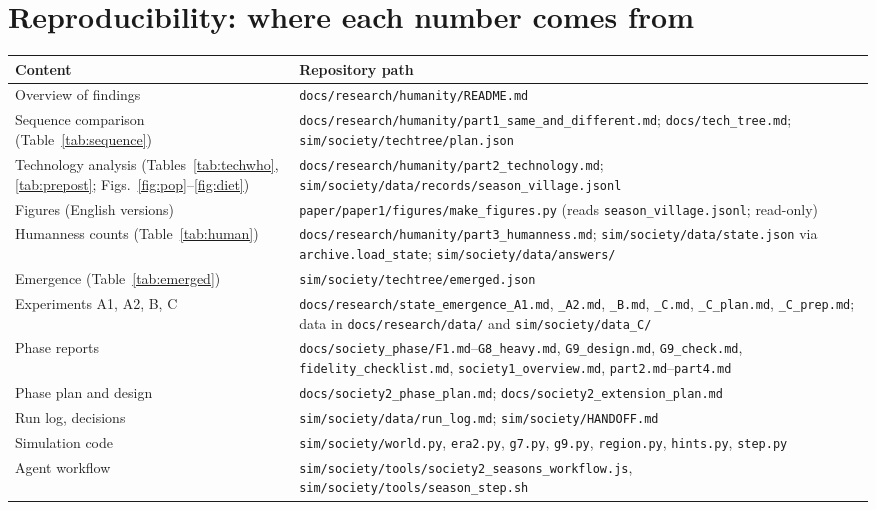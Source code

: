 \documentclass[11pt]{article}
\begin{document}
\section{Reproducibility: where each number comes from}
\begin{center}\small
\begin{tabularx}{\linewidth}{@{}l L@{}}
\toprule
Content & Repository path \\
\midrule
Overview of findings & \texttt{docs/research/humanity/README.md} \\
Sequence comparison (Table~\ref{tab:sequence}) & \texttt{docs/research/humanity/part1\_same\_and\_different.md}; \texttt{docs/tech\_tree.md}; \texttt{sim/society/techtree/plan.json} \\
Technology analysis (Tables~\ref{tab:techwho}, \ref{tab:prepost}; Figs.~\ref{fig:pop}--\ref{fig:diet}) & \texttt{docs/research/humanity/part2\_technology.md}; \texttt{sim/society/data/records/season\_village.jsonl} \\
Figures (English versions) & \texttt{paper/paper1/figures/make\_figures.py} (reads \texttt{season\_village.jsonl}; read-only) \\
Humanness counts (Table~\ref{tab:human}) & \texttt{docs/research/humanity/part3\_humanness.md}; \texttt{sim/society/data/state.json} via \texttt{archive.load\_state}; \texttt{sim/society/data/answers/} \\
Emergence (Table~\ref{tab:emerged}) & \texttt{sim/society/techtree/emerged.json} \\
Experiments A1, A2, B, C & \texttt{docs/research/state\_emergence\_A1.md}, \texttt{\_A2.md}, \texttt{\_B.md}, \texttt{\_C.md}, \texttt{\_C\_plan.md}, \texttt{\_C\_prep.md}; data in \texttt{docs/research/data/} and \texttt{sim/society/data\_C/} \\
Phase reports & \texttt{docs/society\_phase/F1.md}--\texttt{G8\_heavy.md}, \texttt{G9\_design.md}, \texttt{G9\_check.md}, \texttt{fidelity\_checklist.md}, \texttt{society1\_overview.md}, \texttt{part2.md}--\texttt{part4.md} \\
Phase plan and design & \texttt{docs/society2\_phase\_plan.md}; \texttt{docs/society2\_extension\_plan.md} \\
Run log, decisions & \texttt{sim/society/data/run\_log.md}; \texttt{sim/society/HANDOFF.md} \\
Simulation code & \texttt{sim/society/world.py}, \texttt{era2.py}, \texttt{g7.py}, \texttt{g9.py}, \texttt{region.py}, \texttt{hints.py}, \texttt{step.py} \\
Agent workflow & \texttt{sim/society/tools/society2\_seasons\_workflow.js}, \texttt{sim/society/tools/season\_step.sh} \\
\bottomrule
\end{tabularx}
\end{center}
\end{document}
